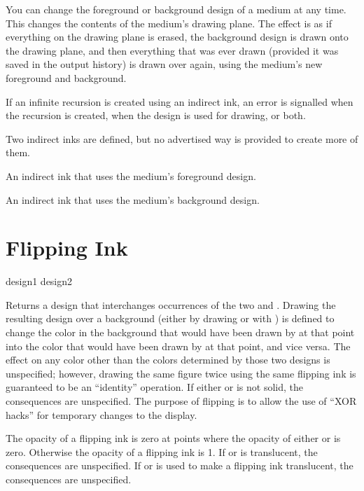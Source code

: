 You can change the foreground or background design of a medium at any time.
This changes the contents of the medium's drawing plane.  The effect is as if
everything on the drawing plane is erased, the background design is drawn onto
the drawing plane, and then everything that was ever drawn (provided it was
saved in the output history) is drawn over again, using the medium's new
foreground and background.

If an infinite recursion is created using an indirect ink, an error is
signalled when the recursion is created, when the design is used for drawing,
or both.

Two indirect inks are defined, but no advertised way is provided to create more
of them.


An indirect ink that uses the medium's foreground design.


An indirect ink that uses the medium's background design.


\section {Flipping Ink}

 {design1 design2}

Returns a design that interchanges occurrences of the two 
 and .  Drawing the resulting design over a background
(either by drawing or with ) is defined to change the color in
the background that would have been drawn by  at that point into
the color that would have been drawn by  at that point, and vice
versa.  The effect on any color other than the colors determined by those two
designs is unspecified; however, drawing the same figure twice using the same
flipping ink is guaranteed to be an ``identity'' operation.  If either
 or  is not solid, the consequences are unspecified.
The purpose of flipping is to allow the use of ``XOR hacks'' for temporary
changes to the display.

The opacity of a flipping ink is zero at points where the opacity of either
 or  is zero.  Otherwise the opacity of a flipping ink
is 1.  If  or  is translucent, the consequences are
unspecified.  If  or  is used to make a flipping
ink translucent, the consequences are unspecified.


